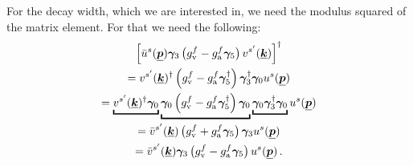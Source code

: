 \documentclass[11pt, english, fleqn, DIV=15, headinclude, BCOR=2cm]{scrreprt}
\begin{document}
For the decay width, which we are interested in, we need the modulus squared of
the matrix element. For that we need the following:
\begin{multline*}
    \sbr{\bar u^s(\four p) \mat\gamma_3 \del{g_\text v^f - g_\text a^f \mat\gamma_5}
    v^{s'}(\four k)}^\dagger \\
    =
    v^{s'}(\four k)^\dagger
    \del{g_\text v^f - g_\text a^f \mat\gamma_5^\dagger}
    \mat\gamma_3^\dagger
    \mat\gamma_0
    u^s(\four p) \\
    =
    \underbracket{v^{s'}(\four k)^\dagger
    \mat\gamma_0}
    \underbracket{\mat\gamma_0
        \del{g_\text v^f - g_\text a^f \mat\gamma_5^\dagger}
    \mat\gamma_0}
    \underbracket{\mat\gamma_0
        \mat\gamma_3^\dagger
    \mat\gamma_0}
    u^s(\four p) \\
    = \bar v^{s'}(\four k)
    \del{g_\text v^f + g_\text a^f \mat\gamma_5}
    \mat\gamma_3
    u^s(\four p) \\
    = \bar v^{s'}(\four k)
    \mat\gamma_3
    \del{g_\text v^f - g_\text a^f \mat\gamma_5}
    u^s(\four p) \,. \\
\end{multline*}
\end{document}
